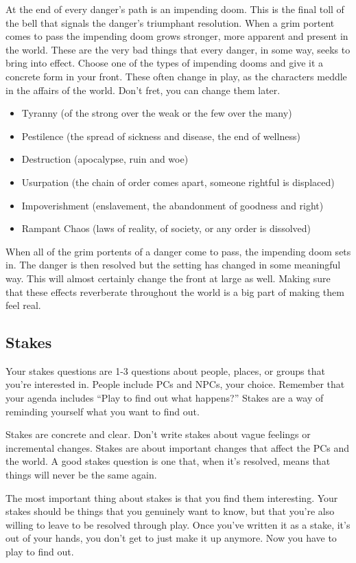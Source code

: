  At the end of every danger's path is an impending doom. This is the final toll of the bell that signals the danger's triumphant resolution. When a grim portent comes to pass the impending doom grows stronger, more apparent and present in the world. These are the very bad things that every danger, in some way, seeks to bring into effect. Choose one of the types of impending dooms and give it a concrete form in your front. These often change in play, as the characters meddle in the affairs of the world. Don't fret, you can change them later.
\begin{itemize}
\item Tyranny (of the strong over the weak or the few over the many)
\item Pestilence (the spread of sickness and disease, the end of wellness)
\item Destruction (apocalypse, ruin and woe)
\item Usurpation (the chain of order comes apart, someone rightful is displaced)
\item Impoverishment (enslavement, the abandonment of goodness and right)
\item Rampant Chaos (laws of reality, of society, or any order is dissolved)

\end{itemize}


 When all of the grim portents of a danger come to pass, the impending doom sets in. The danger is then resolved but the setting has changed in some meaningful way. This will almost certainly change the front at large as well. Making sure that these effects reverberate throughout the world is a big part of making them feel real.
\subsection{Stakes}


 Your stakes questions are 1-3 questions about people, places, or groups that you're interested in. People include PCs and NPCs, your choice. Remember that your agenda includes ``Play to find out what happens?'' Stakes are a way of reminding yourself what you want to find out.


 Stakes are concrete and clear. Don't write stakes about vague feelings or incremental changes. Stakes are about important changes that affect the PCs and the world. A good stakes question is one that, when it's resolved, means that things will never be the same again.


 The most important thing about stakes is that you find them interesting. Your stakes should be things that you genuinely want to know, but that you're also willing to leave to be resolved through play. Once you've written it as a stake, it's out of your hands, you don't get to just make it up anymore. Now you have to play to find out.



